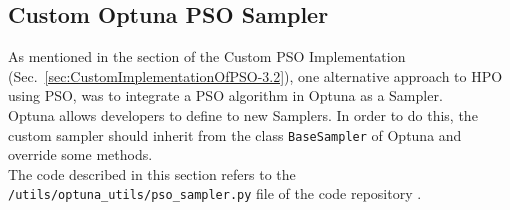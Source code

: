 % 
% 
% 
% 
% 
% 

\subsection{Custom Optuna PSO Sampler}\label{sec:CustomOptunaPSOSampler-3.3.2}
As mentioned in the section of the Custom PSO Implementation (Sec.~\ref{sec:CustomImplementationOfPSO-3.2}), one alternative approach to HPO using PSO, was to integrate a PSO algorithm in Optuna as a Sampler.
\\[0.3cm]Optuna allows developers to define to new Samplers. In order to do this, the custom sampler should inherit from the class \texttt{BaseSampler} of Optuna and override some methods.
\\[0.3cm]The code described in this section refers to the \texttt{/utils/optuna\_utils/pso\_sampler.py} file of the code repository \cite{Repository-THESIS}.


